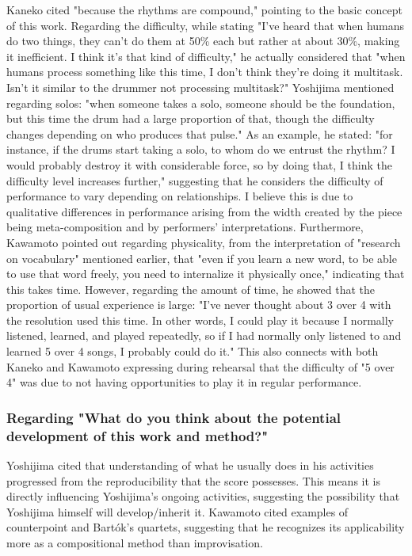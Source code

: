 Kaneko cited "because the rhythms are compound," pointing to the basic concept of this work. Regarding the difficulty, while stating "I've heard that when humans do two things, they can't do them at 50\% each but rather at about 30\%, making it inefficient. I think it's that kind of difficulty," he actually considered that "when humans process something like this time, I don't think they're doing it multitask. Isn't it similar to the drummer not processing multitask?" Yoshijima mentioned regarding solos: "when someone takes a solo, someone should be the foundation, but this time the drum had a large proportion of that, though the difficulty changes depending on who produces that pulse." As an example, he stated: "for instance, if the drums start taking a solo, to whom do we entrust the rhythm? I would probably destroy it with considerable force, so by doing that, I think the difficulty level increases further," suggesting that he considers the difficulty of performance to vary depending on relationships. I believe this is due to qualitative differences in performance arising from the width created by the piece being meta-composition and by performers' interpretations. Furthermore, Kawamoto pointed out regarding physicality, from the interpretation of "research on vocabulary" mentioned earlier, that "even if you learn a new word, to be able to use that word freely, you need to internalize it physically once," indicating that this takes time. However, regarding the amount of time, he showed that the proportion of usual experience is large: "I've never thought about 3 over 4 with the resolution used this time. In other words, I could play it because I normally listened, learned, and played repeatedly, so if I had normally only listened to and learned 5 over 4 songs, I probably could do it." This also connects with both Kaneko and Kawamoto expressing during rehearsal that the difficulty of "5 over 4" was due to not having opportunities to play it in regular performance.

\subsubsection{Regarding "What do you think about the potential development of this work and method?"}

Yoshijima cited that understanding of what he usually does in his activities progressed from the reproducibility that the score possesses. This means it is directly influencing Yoshijima's ongoing activities, suggesting the possibility that Yoshijima himself will develop/inherit it. Kawamoto cited examples of counterpoint and Bartók's quartets, suggesting that he recognizes its applicability more as a compositional method than improvisation.

